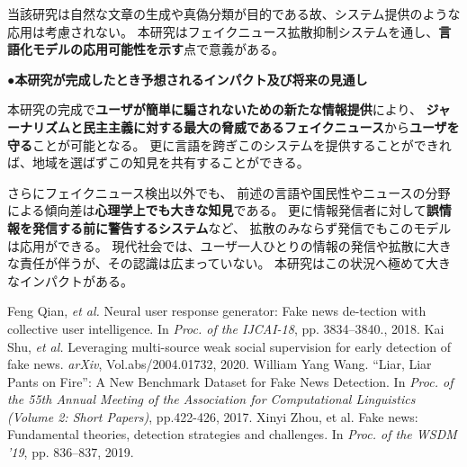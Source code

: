 {	当該研究は⾃然な文章の⽣成や真偽分類が⽬的である故、システム提供のような応⽤は考慮されない。
	本研究はフェイクニュース拡散抑制システムを通し、\textbf{⾔語化モデルの応⽤可能性を⽰す}点で意義がある。

	\noindent
	●\textbf{本研究が完成したとき予想されるインパクト及び将来の見通し}
	
	本研究の完成で\textbf{ユーザが簡単に騙されないための新たな情報提供}により、
	\textbf{ジャーナリズムと民主主義に対する最大の脅威であるフェイクニュース}\cite{zhou2019wsdm}から\textbf{ユーザを守る}ことが可能となる。
	更に言語を跨ぎこのシステムを提供することができれば、地域を選ばずこの知見を共有することができる。
	
	さらにフェイクニュース検出以外でも、
	前述の言語や国民性やニュースの分野による傾向差は\textbf{心理学上でも大きな知見}である。
	更に情報発信者に対して\textbf{誤情報を発信する前に警告するシステム}など、
	拡散のみならず発信でもこのモデルは応用ができる。
	現代社会では、ユーザ一人ひとりの情報の発信や拡散に大きな責任が伴うが、その認識は広まっていない。
	本研究はこの状況へ極めて⼤きなインパクトがある。

	

	{\footnotesize
		\begin{thebibliography}{99}
			\setcounter{enumiv}{7}
			\vspace*{-2mm}
			\setlength{\parskip}{0cm}
			\setlength{\itemsep}{0cm}
			\begin{spacing}{0.7}
				 Feng Qian, \textit{et al.} Neural user response generator: Fake news de-tection with collective user intelligence. In \textit{Proc. of the IJCAI-18}, pp. 3834–3840., 2018.
				 Kai Shu, \textit{et al.} Leveraging multi-source weak social supervision for early detection of fake news. \textit{arXiv}, Vol.abs/2004.01732, 2020.
				William Yang Wang. ``Liar, Liar Pants on Fire'': A New Benchmark Dataset for Fake News Detection. In \textit{Proc. of the 55th Annual Meeting of the Association for Computational Linguistics (Volume 2: Short Papers)}, pp.422-426, 2017.
				Xinyi Zhou, et al. Fake news: Fundamental theories, detection strategies and challenges. In \textit{Proc. of the WSDM '19}, pp. 836–837, 2019.
			\end{spacing}
		\end{thebibliography}
	}
}


